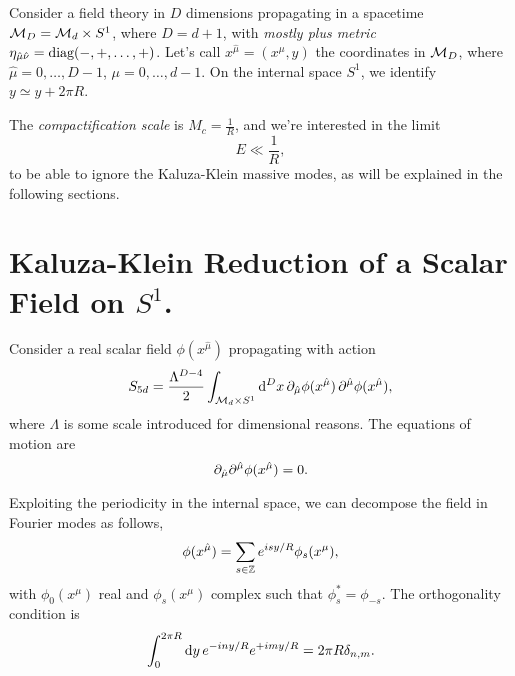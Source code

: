 Consider a field theory in $D$ dimensions propagating in a spacetime $\mathcal{M}_D = \mathcal{M}_d \times S^1$, where $D = d+1$, with \emph{mostly plus metric} $\eta_{\hat{\mu}\hat{\nu}}= \textup{diag}(-,+,\dots,+)$. Let's call $x^{\hat{\mu}} = (x^\mu, y)$ the coordinates in $\mathcal{M}_D$, where $\hat{\mu} = 0, \dots, D-1$, $\mu = 0, \dots, d-1$. On the internal space $S^1$, we identify $y \simeq y + 2\pi R$. 

The \emph{compactification scale} is $M_c = \frac{1}{R}$, and we're interested in the limit
\begin{equation}
    E \ll \frac{1}{R},
\end{equation}
to be able to ignore the Kaluza-Klein massive modes, as will be explained in the following sections.

\section{Kaluza-Klein Reduction of a Scalar Field on \texorpdfstring{$S^1$}{S1}.}
Consider a real scalar field $\phi(x^{\hat{\mu}})$ propagating with action
\begin{equation}
    S_{5d} = \frac{\Lambda^{D-4}}{2} \int_{\mathcal{M}_{d} \times S^1} \mathop{}\!\mathrm{d}^D x \,  \partial_{\hat{\mu}} \phi(x^{\hat{\mu}}) \, \partial^{\hat{\mu}} \phi(x^{\hat{\mu}}),
\end{equation}
where $\Lambda$ is some scale introduced for dimensional reasons. The equations of motion are
\begin{equation}\label{eq:scalar-eq-motion}
    \partial_{\hat{\mu}} \partial^{\hat{\mu}}  \phi(x^{\hat{\mu}}) = 0.
\end{equation}

Exploiting the periodicity in the internal space, we can decompose the field in Fourier modes as follows,
\begin{equation}\label{eq:scalar-expansion}
    \phi(x^{\hat{\mu}}) = \sum_{s \in \mathbb{Z}} e^{isy/R} \phi_s(x^\mu),
\end{equation}
with $\phi_0(x^\mu)$ real and $\phi_s(x^\mu)$ complex such that $\phi^*_s = \phi_{-s}$. The orthogonality condition is
\begin{equation}\label{eq:orthogonality}
    \int_0^{2\pi R} \mathop{}\!\mathrm{d} y \, e^{-iny/R} e^{+imy/R} = 2\pi R \delta_{n,m} .
\end{equation}

